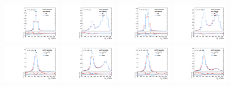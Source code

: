 \begin{figure}[htbp]
  \centering
  \includegraphics[width=0.21\textwidth]{fig/uncertainties/systs_res_e_HP_bb_LDy_resWY_ProjY.pdf}
  \includegraphics[width=0.21\textwidth]{fig/uncertainties/systs_res_e_LP_bb_LDy_resWY_ProjY.pdf}
  \includegraphics[width=0.21\textwidth]{fig/uncertainties/systs_res_e_HP_bb_HDy_resWY_ProjY.pdf}
  \includegraphics[width=0.21\textwidth]{fig/uncertainties/systs_res_e_LP_bb_HDy_resWY_ProjY.pdf}\\
  \includegraphics[width=0.21\textwidth]{fig/uncertainties/systs_res_e_HP_nobb_LDy_resWY_ProjY.pdf}
  \includegraphics[width=0.21\textwidth]{fig/uncertainties/systs_res_e_LP_nobb_LDy_resWY_ProjY.pdf}
  \includegraphics[width=0.21\textwidth]{fig/uncertainties/systs_res_e_HP_nobb_HDy_resWY_ProjY.pdf}
  \includegraphics[width=0.21\textwidth]{fig/uncertainties/systs_res_e_LP_nobb_HDy_resWY_ProjY.pdf}\\

\end{figure}
